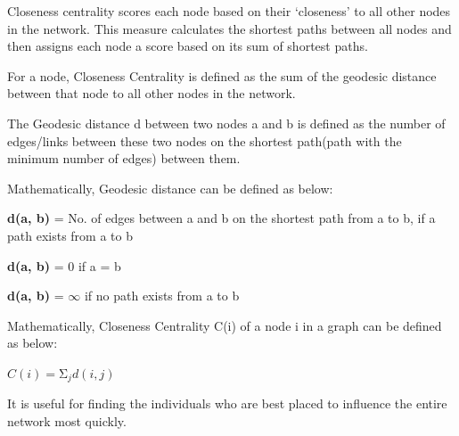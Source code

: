 \documentclass[12pt, a4paper]{article}
\begin{document}
    \begin{flushleft}
    Closeness centrality scores each node based on their ‘closeness’ to all other nodes in the network. This measure calculates the shortest paths between all nodes and then assigns each node a score based on its sum of shortest paths.

    For a node, Closeness Centrality is defined as the sum of the geodesic distance between that node to all other nodes in the network.
    
    The Geodesic distance d between two nodes a and b is defined as the number of edges/links between these two nodes on the shortest path(path with the minimum number of edges) between them.
    
    Mathematically, Geodesic distance can be defined as below:
    
    \textbf{d(a, b)} = No. of edges between a and b on the shortest path from a to b, if a path exists from a to b
    
    \textbf{d(a, b)} = 0 if a = b
    
    \textbf{d(a, b)} = $\infty$ if no path exists from a to b

    Mathematically, Closeness Centrality C(i) of a node i in a graph can be defined as below:

    $C\left(i\right)=\mathrm{\Sigma}_jd\left(i,j\right) $

    It is useful for finding the individuals who are best placed to influence the entire network most quickly.
    
    \end{flushleft}
\end{document}

